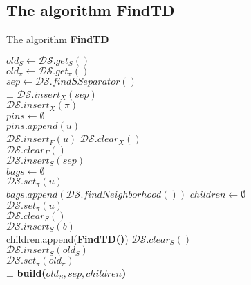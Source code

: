 \documentclass{article}
\theoremstyle{definition}
\theoremstyle{lemma}
\theoremstyle{corollary}
\theoremstyle{theorem}
\begin{document}
\subsection{The algorithm \textbf{FindTD}}
\begin{algorithm}[H]
	\SetAlgoLined
	\caption{The algorithm \textbf{FindTD}}
	
	$old_S \leftarrow \mathcal{DS}.get_S()$ \\
	$old_\pi \leftarrow \mathcal{DS}.get_\pi()$ \\
	$sep \leftarrow \mathcal{DS}.findSSeparator()$ \\
	 {
		\KwRet $\bot$
	}
	$\mathcal{DS}.insert_X(sep)$ \\
	$\mathcal{DS}.insert_X(\pi)$ \\
	$pins \leftarrow \emptyset$ \\
	 {
		$pins.append(u)$ \\
		$\mathcal{DS}.insert_F(u)$
	}
	$\mathcal{DS}.clear_X()$ \\
	$\mathcal{DS}.clear_F()$ \\
	$\mathcal{DS}.insert_S(sep)$ \\
	$bags \leftarrow \emptyset$ \\
	 {
		$\mathcal{DS}.set_\pi(u)$ \\
		$bags.append(\mathcal{DS}.findNeighborhood())$
	}
	$children \leftarrow \emptyset$ \\
	 {
		$\mathcal{DS}.set_\pi(u)$ \\
		$\mathcal{DS}.clear_S()$ \\
		$\mathcal{DS}.insert_S(b)$ \\
		children.append(\textbf{FindTD()})
	}
	$\mathcal{DS}.clear_S()$ \\
	$\mathcal{DS}.insert_S(old_S)$ \\
	$\mathcal{DS}.set_\pi(old_\pi)$ \\
	 {
		\KwRet $\bot$
	}
	\KwRet \textbf{build($old_S, sep, children$)}
\end{algorithm}
\end{document}
